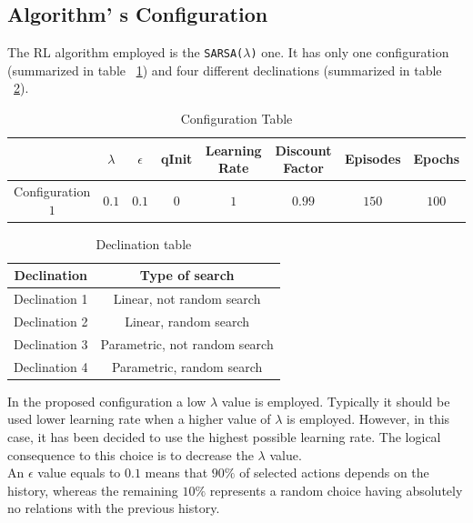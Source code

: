 \subsection{Algorithm' s Configuration} The RL algorithm employed is the {\tt SARSA($\lambda$)} one. It has only one configuration (summarized in table ~\ref{ConfigurationTable}) and four different declinations (summarized in table ~\ref{DeclinationTable}).

\begin{table} [h!]
	\centering
	\resizebox{\linewidth}{!} {	
	\begin{tabular}{|c||c|c|c|c|c|c|c|}
		\hline 
		& \textbf{$\lambda$}  & \textbf{$\epsilon$} & \textbf{qInit} & \textbf{Learning Rate} & \textbf{Discount Factor}  & \textbf{Episodes}  & \textbf{Epochs} \\
		\hline \hline Configuration $1$
		& $0.1$ & $0.1$ & $0$ & $1$ & $0.99$  & $150$ & $100$  \\ 
		\hline
	\end{tabular}
}
\caption{Configuration Table}
\label{ConfigurationTable}
\end{table}

\begin{table} [h!]
	\centering	
	\begin{tabular}{|c||c|}
		\hline \textbf{Declination}
		& \textbf{Type of search} \\ 
		\hline \hline Declination 1
		&  Linear, not random search\\ 
		\hline Declination 2
		& Linear, random search \\ 
		\hline Declination 3
		& Parametric, not random search \\ 
		\hline Declination 4
		&  Parametric, random search\\ 
		\hline 
	\end{tabular} 
\caption{Declination table}
\label{DeclinationTable}
\end{table}

In the proposed configuration a low $\lambda$ value is employed. Typically it should be used lower learning rate when a higher value of $\lambda$ is employed. However, in this case, it has been decided to use the highest possible learning rate. The logical consequence to this choice is to decrease the $\lambda$ value. \\

An $\epsilon$ value equals to $0.1$ means that $90\%$ of selected actions depends on the history, whereas the remaining $10\%$ represents a random choice having absolutely no relations with the previous history. \\ 


